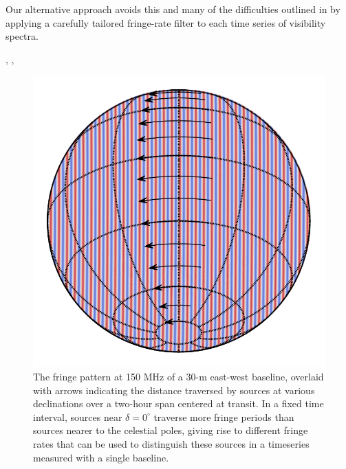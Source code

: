 \documentclass[twocolumn,apj,numberedappendix]{emulateapj}
\begin{document}
Our alternative approach avoids this and many of the difficulties outlined
in \citet{hazelton_et_al2013} by applying a carefully tailored
fringe-rate filter to each time series of visibility spectra.  




\citep{parsons_backer2009}, \citep{shaw_et_al2013}, 

\begin{figure}
\includegraphics[width=.9\columnwidth]{plots/ew_fringe}
\caption{
The fringe pattern at 150 MHz of a 30-m east-west baseline, overlaid with arrows indicating
the distance traversed by sources at various declinations over a two-hour span centered at transit.
In a fixed time interval, sources near $\delta=0^\circ$ traverse more 
fringe periods than sources nearer to the celestial poles, giving rise to different
fringe rates that can be used to distinguish these sources in a timeseries measured with a single baseline.
}\label{fig:ew_fringe}
\end{figure}
\end{document}
